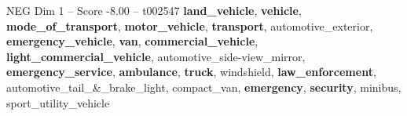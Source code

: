 \begin{textsample}{NEG Dim 1 – Score -8.00 – t002547}  \label{ex:f1_neg_001}
\textbf{land\_vehicle}, \textbf{vehicle}, \textbf{mode\_of\_transport}, \textbf{motor\_vehicle}, \textbf{transport}, automotive\_exterior, \textbf{emergency\_vehicle}, \textbf{van}, \textbf{commercial\_vehicle}, \textbf{light\_commercial\_vehicle}, automotive\_side-view\_mirror, \textbf{emergency\_service}, \textbf{ambulance}, \textbf{truck}, windshield, \textbf{law\_enforcement}, automotive\_tail\_\&\_brake\_light, compact\_van, \textbf{emergency}, \textbf{security}, minibus, sport\_utility\_vehicle

\end{textsample}

